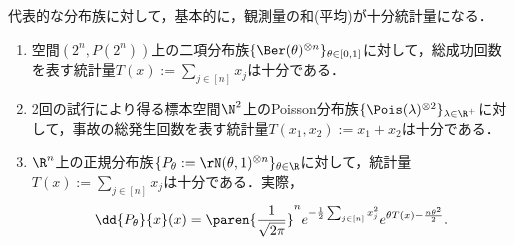 \documentclass[uplatex,dvipdfmx]{jsreport}
\begin{document}
\begin{example}[独立和が与える十分統計量]\label{exp-独立和が与える十分統計量}
    代表的な分布族に対して，基本的に，観測量の和(平均)が十分統計量になる．
    \begin{enumerate}
        \item 空間$(2^n,P(2^n))$上の二項分布族$\{\Ber(\theta)^{\otimes n}\}_{\theta\in[0,1]}$に対して，総成功回数を表す統計量$T(x):=\sum_{j\in[n]}x_j$は十分である．
        \item 2回の試行により得る標本空間$\N^2$上のPoisson分布族$\{\Pois(\lambda)^{\otimes 2}\}_{\lambda\in\R^+}$に対して，事故の総発生回数を表す統計量$T(x_1,x_2):=x_1+x_2$は十分である．
        \item $\R^n$上の正規分布族$\{P_\theta:=\rN(\theta,1)^{\otimes n}\}_{\theta\in\R}$に対して，統計量$T(x):=\sum_{j\in[n]}x_j$は十分である．実際，
        \[\dd{P_\theta}{x}(x)=\paren{\frac{1}{\sqrt{2\pi}}}^ne^{-\frac{1}{2}\sum_{j\in[n]}x_j^2}e^{\theta T(x)-\frac{n\theta^2}{2}}.\]
    \end{enumerate}
\end{example}
\end{document}
